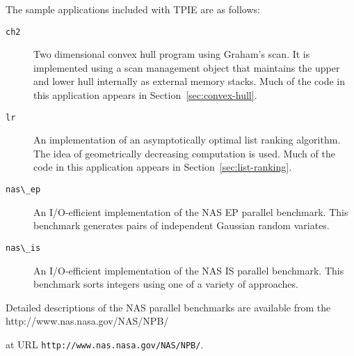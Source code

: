 The sample applications included with TPIE are as follows:

\begin{description}
\item[\verb|ch2|] Two dimensional convex hull
  program using Graham's scan.  It is implemented using a scan
  management object that maintains the upper and lower hull internally
  as external memory stacks.  Much of the code in this application
  appears in Section~\ref{sec:convex-hull}.
\item[\verb|lr|] An implementation of an asymptotically optimal list
  ranking  algorithm.  The idea of geometrically
  decreasing computation is used.  Much of the code in this
  application appears in Section~\ref{sec:list-ranking}.
\item[\verb|nas\_ep|] An I/O-efficient implementation of the NAS EP
  parallel benchmark.  This benchmark generates pairs of independent
  Gaussian random variates.
\item[\verb|nas\_is|] An I/O-efficient implementation of the NAS IS
  parallel benchmark.  This benchmark sorts integers using one of a
  variety of approaches.
\end{description}

Detailed descriptions of the NAS parallel benchmarks are available
from the %
{http://www.nas.nasa.gov/NAS/NPB/}
\begin{latexonly}
at URL \verb|http://www.nas.nasa.gov/NAS/NPB/|.
\end{latexonly}
